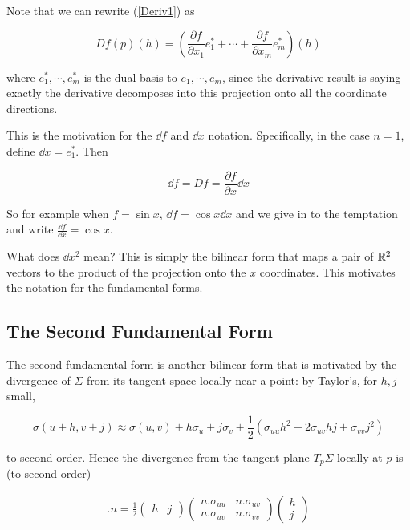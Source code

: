 \documentclass[11pt]{scrartcl}
\begin{document}
Note that we can rewrite (\ref{Deriv1}) as 

\begin{equation}
    Df(p)(h) = \left( \frac{\partial f}{\partial x_1} e_1^* + \cdots + \frac{\partial f}{\partial x_m} e_m^* \right)(h)
\end{equation}

where $e_1^* , \cdots , e_m^*$ is the dual basis to $e_1, \cdots , e_m$, since the derivative result is saying exactly the derivative decomposes into this projection onto all the coordinate directions.

This is the motivation for the $\dd f$ and $\dd x$ notation. Specifically, in the case $n=1$, define $\dd x = e_1^*$. Then

\begin{equation}
    \dd f = Df = \frac{\partial f}{\partial x} \dd x
\end{equation}

So for example when $f = \sin x$, $\dd f = \cos x \dd x$ and we give in to the temptation and write $\frac{\dd f}{\dd x} = \cos x$.

What does $\dd x^2$ mean? This is simply the bilinear form that maps a pair of $\mathbb R^2$ vectors to the product of the projection onto the $x$ coordinates. This motivates the notation for the fundamental forms.

\subsection{The Second Fundamental Form}

The second fundamental form is another bilinear form that is motivated by the divergence of $\Sigma$ from its tangent space locally near a point: by Taylor's, for $h, j$ small,

\begin{equation}
\sigma(u+h,v+j) \approx \sigma(u,v) + h \sigma_u + j \sigma_v + 
\frac12 (\sigma_{uu}h^2 + 2\sigma_{uv}hj + \sigma_{vv}j^2)
\end{equation}

to second order. Hence the divergence from the tangent plane $T_p \Sigma$ locally at $p$ is (to second order)

\begin{align}
        [ \sigma(u+h,v+j) - \sigma(u,v) ].n 
        = \frac12 \begin{pmatrix}h & j\end{pmatrix} \begin{pmatrix} n.\sigma_{uu} & n.\sigma_{uv} \\ n.\sigma_{uv} & n.\sigma_{vv} \end{pmatrix} \begin{pmatrix} h\\ j \end{pmatrix}
\end{align} %
\end{document}
